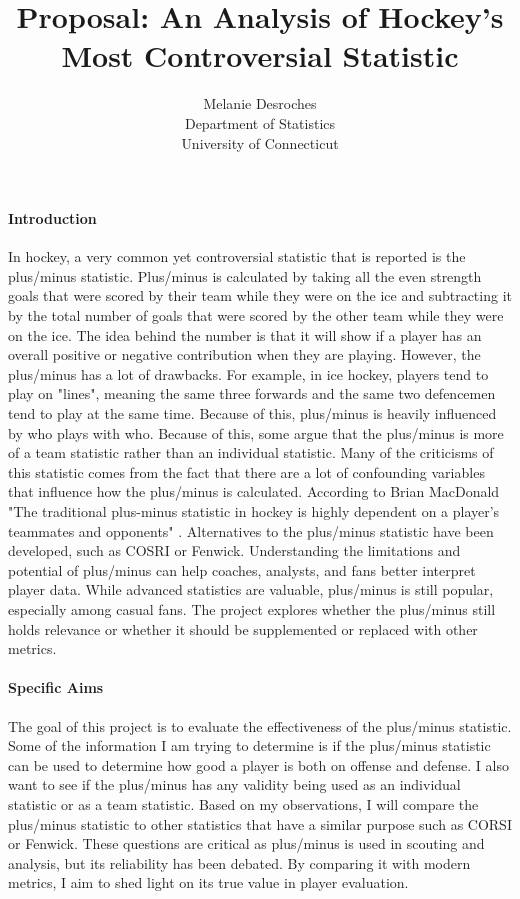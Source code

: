 \documentclass[12pt]{article}
\title{Proposal: An Analysis of Hockey's Most Controversial Statistic}
\author{Melanie Desroches\\
  Department of Statistics\\
  University of Connecticut
}
\begin{document}
\maketitle


\paragraph{Introduction}
In hockey, a very common yet controversial statistic that is reported is the plus/minus statistic. Plus/minus is 
calculated by taking all the even strength goals that were scored by their team while they were on the ice and 
subtracting it by the total number of goals that were scored by the other team while they were on the ice. The 
idea behind the number is that it will show if a player has an overall positive or negative contribution when 
they are playing. However, the plus/minus has a lot of drawbacks. For example, in ice hockey, players tend to play 
on "lines", meaning the same three forwards and the same two defencemen tend to play at the same time. Because of this, 
plus/minus is heavily influenced by who plays with who. Because of this, some argue that the plus/minus is more of a team 
statistic rather than an individual statistic. Many of the criticisms of this statistic comes from the fact that
there are a lot of confounding variables that influence how the plus/minus is calculated. According to Brian MacDonald 
"The traditional plus-minus statistic in hockey is highly dependent on a player’s teammates and opponents" \cite{Macdonald_2011}.
Alternatives to the plus/minus statistic have been developed, such as COSRI or Fenwick. Understanding the limitations and
potential of plus/minus can help coaches, analysts, and fans better interpret player data. While advanced statistics are valuable, 
plus/minus is still popular, especially among casual fans. The project explores whether the plus/minus still holds relevance or 
whether it should be supplemented or replaced with other metrics.


\paragraph{Specific Aims}
The goal of this project is to evaluate the effectiveness of the plus/minus statistic. Some of the information I am trying
to determine is if the plus/minus statistic can be used to determine how good a player is both on offense and defense. I 
also want to see if the plus/minus has any validity being used as an individual statistic or as a team statistic. Based on my 
observations, I will compare the plus/minus statistic to other statistics that have a similar purpose such as CORSI or Fenwick. 
These questions are critical as plus/minus is used in scouting and analysis, but its reliability has been debated. By comparing 
it with modern metrics, I aim to shed light on its true value in player evaluation.
\end{document}
